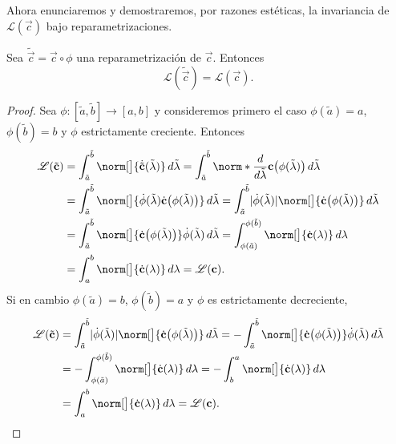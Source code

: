 Ahora enunciaremos y demostraremos, por razones estéticas, la invariancia de $\mathscr L(\vec c)$ bajo reparametrizaciones.
\begin{proposition}
	Sea $\tilde{\vec c} = \vec c \circ \phi$ una reparametrización de $\vec c$. Entonces
	\begin{equation}
		\mathscr L (\tilde{\vec c}) = \mathscr L (\vec c).
	\end{equation}
\end{proposition}
\begin{proof}
	Sea $\phi : [\tilde a, \tilde b] \to [a, b]$ y consideremos primero el caso $\phi(\tilde a) = a$, $\phi(\tilde b) = b$ y $\phi$ estrictamente creciente. Entonces
	\begin{equation}
		\begin{split}
		\mathscr L(\tilde {\vec c}) &= \int_{\tilde a}^{\tilde b}\norm[\big]{\dot{\tilde{\vec c}}(\tilde \lambda)} \, d\tilde{\lambda}
		= \int_{\tilde a}^{\tilde b}\norm*{\frac{d}{d\tilde \lambda}{\vec c}\bigl( \phi(\tilde \lambda)\bigr)} \, d\tilde{\lambda}\\
		&= \int_{\tilde a}^{\tilde b}\norm[\big]{\dot \phi(\tilde \lambda)\dot{{\vec c}}\bigl( \phi(\tilde \lambda)\bigr)} \, d\tilde{\lambda}
		= \int_{\tilde a}^{\tilde b} \abs{\dot \phi(\tilde \lambda)}\norm[\big]{\dot{{\vec c}}\bigl( \phi(\tilde \lambda)\bigr)} \, d\tilde{\lambda}\\
		&= \int_{\tilde a}^{\tilde b}  \norm[\big]{\dot{{\vec c}}\bigl( \phi(\tilde \lambda)\bigr)} \dot \phi(\tilde \lambda)\, d\tilde{\lambda}
		= \int_{\phi(\tilde a)}^{\phi(\tilde b)}  \norm[\big]{\dot{{\vec c}} ( \lambda )}\, d\lambda\\
		&= \int_{a}^{b} \norm[\big]{\dot{{\vec c}} ( \lambda )}\, d\lambda
		= \mathscr L(\vec c).
		\end{split}
	\end{equation}
	Si en cambio $\phi(\tilde a) = b$, $\phi(\tilde b) = a$ y $\phi$ es estrictamente decreciente,
	\begin{equation}
		\begin{split}
		\mathscr L(\tilde {\vec c}) &= \int_{\tilde a}^{\tilde b} \abs{\dot \phi(\tilde \lambda)}\norm[\big]{\dot{{\vec c}}\bigl( \phi(\tilde \lambda)\bigr)} \, d\tilde{\lambda}
		= -\int_{\tilde a}^{\tilde b}  \norm[\big]{\dot{{\vec c}}\bigl( \phi(\tilde \lambda)\bigr)} \dot \phi(\tilde \lambda)\, d\tilde{\lambda}\\
		&= -\int_{\phi(\tilde a)}^{\phi(\tilde b)}  \norm[\big]{\dot{{\vec c}} ( \lambda )}\, d\lambda
		= -\int_{b}^{a} \norm[\big]{\dot{{\vec c}} ( \lambda )}\, d\lambda\\
		&= \int_{a}^{b} \norm[\big]{\dot{{\vec c}} ( \lambda )}\, d\lambda
		= \mathscr L(\vec c).
		\end{split}
	\end{equation}
\end{proof}

